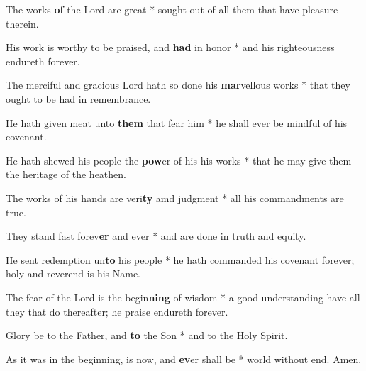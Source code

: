 \begin{multicols}{2}
	The works \textbf{of} the Lord are great * sought out of all them that have pleasure therein.
	
	His work is worthy to be praised, and \textbf{had} in honor * and his righteousness endureth forever.
	
	The merciful and gracious Lord hath so done his \textbf{mar}vellous works * that they ought to be had in remembrance.
	
	He hath given meat unto \textbf{them} that fear him * he shall ever be mindful of his covenant.
	
	He hath shewed his people the \textbf{pow}er of his his works * that he may give them the heritage of the heathen.
	
	The works of his hands are veri\textbf{ty} amd judgment * all his commandments are true.
	
	They stand fast forev\textbf{er} and ever * and are done in truth and equity.
	
	He sent redemption un\textbf{to} his people * he hath commanded his covenant forever; holy and reverend is his Name.
	
	The fear of the Lord is the begin\textbf{ning} of wisdom * a good understanding have all they that do thereafter; he praise endureth forever.
	
	Glory be to the Father, and \textbf{to} the Son * and to the Holy Spirit.
	
	As it was in the beginning, is now, and \textbf{ev}er shall be * world without end. Amen.
\end{multicols}